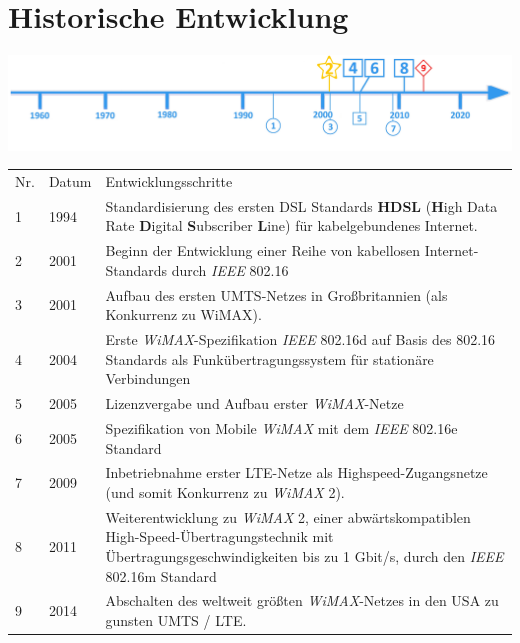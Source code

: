 \section*{Historische Entwicklung}
\includegraphics[width=\textwidth]{Kapitel/WiMAX/Grafiken/Zeitstrahl}
\par
\noindent
{}
\begin{tabular}{p{0.5 cm}p{1.5 cm}p{15.55 cm}}
	Nr. & Datum & Entwicklungsschritte~\cite{wmx.2}\\
	1 & 1994 & Standardisierung des ersten DSL Standards \textbf{HDSL} (\textbf{H}igh Data Rate \textbf{D}igital \textbf{S}ubscriber \textbf{L}ine) für kabelgebundenes Internet.~\cite{wmx.5}\\
	2 & 2001 & Beginn der Entwicklung einer Reihe von kabellosen Internet-Standards durch \textit{IEEE} 802.16\\
	3 & 2001 & Aufbau des ersten UMTS-Netzes in Großbritannien (als Konkurrenz zu WiMAX).~\cite{wmx.6}\\
	4 & 2004 & Erste \textit{WiMAX}-Spezifikation \textit{IEEE} 802.16d auf Basis des 802.16 Standards als Funkübertragungssystem für stationäre Verbindungen\\
	5 & 2005 & Lizenzvergabe und Aufbau erster \textit{WiMAX}-Netze\\
	6 & 2005 & Spezifikation von Mobile \textit{WiMAX} mit dem \textit{IEEE} 802.16e Standard\\
	7 & 2009 & Inbetriebnahme erster LTE-Netze als Highspeed-Zugangsnetze (und somit Konkurrenz zu \textit{WiMAX} 2).~\cite{wmx.7}\\
	8 & 2011 & Weiterentwicklung zu \textit{WiMAX} 2, einer abwärtskompatiblen High-Speed-Übertragungstechnik mit Übertragungsgeschwindigkeiten bis zu 1 Gbit/s, durch den \textit{IEEE} 802.16m Standard\\
	9 & 2014 & Abschalten des weltweit größten \textit{WiMAX}-Netzes in den USA zu gunsten UMTS / LTE.~\cite{wmx.4}\\
\end{tabular}
\par
